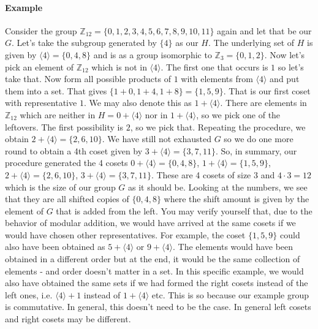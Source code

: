 \paragraph{Example}
Consider the group $\mathbb{Z}_{12} = \{0,1,2,3,4,5,6,7,8,9,10,11\}$ again and let that be our $G$. Let's take the subgroup generated by $\{4\}$ as our $H$. The underlying set of $H$ is given by $\langle 4 \rangle = \{0,4,8\}$ and is as a group isomorphic to $\mathbb{Z}_{3} = \{0,1,2\}$. Now let's pick an element of $\mathbb{Z}_{12}$ which is not in $\langle 4 \rangle$. The first one that occurs is $1$ so let's take that. Now form all possible products of $1$ with elements from $\langle 4 \rangle$ and put them into a set. That gives $\{1+0,1+4,1+8\} = \{1,5,9\}$. That is our first coset with representative $1$. We may also denote this as $1 + \langle 4 \rangle$. There are elements in $\mathbb{Z}_{12}$ which are neither in $H = 0 + \langle 4 \rangle$ nor in $1 + \langle 4 \rangle$, so we pick one of the leftovers. The first possibility is $2$, so we pick that. Repeating the procedure, we obtain $2 + \langle 4 \rangle = \{2,6,10\}$. We have still not exhausted $G$ so we do one more round to obtain a 4th coset given by $3 + \langle 4 \rangle = \{3,7,11\}$. So, in summary, our procedure generated the 4 cosets $0 + \langle 4 \rangle = \{0,4,8\}$, $1 + \langle 4 \rangle = \{1,5,9\}$, $2 + \langle 4 \rangle = \{2,6,10\}$, $3 + \langle 4 \rangle = \{3,7,11\}$. These are 4 cosets of size 3 and $4 \cdot 3 = 12$ which is the size of our group $G$ as it should be. Looking at the numbers, we see that they are all shifted copies of $\{0,4,8\}$ where the shift amount is given by the element of $G$ that is added from the left. You may verify yourself that, due to the behavior of modular addition, we would have arrived at the same cosets if we would have chosen other representatives. For example, the coset $\{1,5,9\}$ could also have been obtained as $5 + \langle 4 \rangle$ or $9 + \langle 4 \rangle$. The elements would have been obtained in a different order but at the end, it would be the same collection of elements - and order doesn't matter in a set. In this specific example, we would also have obtained the same sets if we had formed the right cosets instead of the left ones, i.e. $\langle 4 \rangle + 1$ instead of $1 + \langle 4 \rangle$ etc. This is so because our example group is commutative. In general, this doesn't need to be the case. In general left cosets and right cosets may be different.


